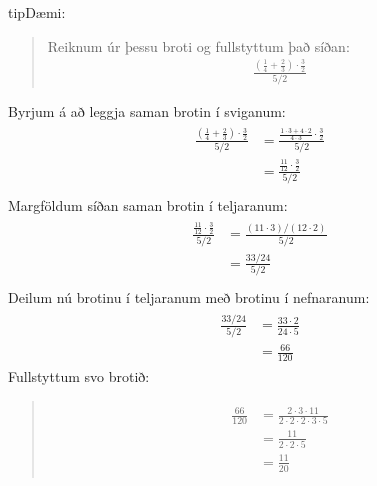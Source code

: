 \documentclass[a4paper,10pt,icelandic]{sphinxmanual}
\begin{document}
\begin{sphinxadmonition}{tip}{Dæmi:}\begin{quote}

Reiknum úr þessu broti og fullstyttum það síðan:
\begin{equation*}
\begin{split}\frac{\left(\frac{1}{4}+\frac{2}{3} \right)\cdot\frac{3}{2}}{5/2}\end{split}
\end{equation*}\end{quote}


Byrjum á að leggja saman brotin í sviganum:
\begin{equation*}
\begin{split}\begin{aligned}
 \frac{\left(\frac{1}{4}+\frac{2}{3} \right)\cdot\frac{3}{2}}{5/2} &= \frac{\frac{1\cdot 3+4\cdot 2}{4\cdot 3}\cdot\frac{3}{2}}{5/2} \\
 &= \frac{\frac{11}{12}\cdot\frac{3}{2}}{5/2} \\
\end{aligned}\end{split}
\end{equation*}
Margföldum síðan saman brotin í teljaranum:
\begin{equation*}
\begin{split}\begin{aligned}
             \frac{\frac{11}{12}\cdot\frac{3}{2}}{5/2}&= \frac{(11\cdot 3)/(12\cdot 2)}{5/2} \\
             &= \frac{33/24}{5/2} \\
\end{aligned}\end{split}
\end{equation*}
Deilum nú brotinu í teljaranum með brotinu í nefnaranum:
\begin{equation*}
\begin{split}\begin{aligned}
\frac{33/24}{5/2} &= \frac{33\cdot 2}{24\cdot 5} \\
&= \frac{66}{120}
\end{aligned}\end{split}
\end{equation*}
Fullstyttum svo brotið:
\begin{quote}
\begin{equation*}
\begin{split}\begin{aligned}
\frac{66}{120} &= \frac{2\cdot 3\cdot 11}{2\cdot 2 \cdot 2 \cdot 3\cdot 5} \\
&= \frac{11}{2\cdot 2\cdot 5} \\
&= \frac{11}{20}
\end{aligned}\end{split}
\end{equation*}\end{quote}
\end{sphinxadmonition}
\end{document}
